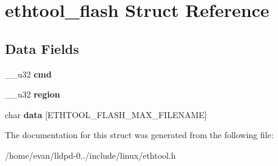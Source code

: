 \section{ethtool\-\_\-flash \-Struct \-Reference}
\label{structethtool__flash}
\subsection*{\-Data \-Fields}
\begin{DoxyCompactItemize}
\item 
\-\_\-\-\_\-u32 {\bfseries cmd}\label{structethtool__flash_a66d231264d5aa36fd7d347e2c967769a}

\item 
\-\_\-\-\_\-u32 {\bfseries region}\label{structethtool__flash_a35c64b9885a516460928c3acf36c3cfb}

\item 
char {\bfseries data} [\-E\-T\-H\-T\-O\-O\-L\-\_\-\-F\-L\-A\-S\-H\-\_\-\-M\-A\-X\-\_\-\-F\-I\-L\-E\-N\-A\-M\-E]\label{structethtool__flash_aecf3ea994b181e8a2d63bef49c0afaf7}

\end{DoxyCompactItemize}


\-The documentation for this struct was generated from the following file\-:\begin{DoxyCompactItemize}
\item 
/home/evan/lldpd-\/0../include/linux/ethtool.\-h\end{DoxyCompactItemize}
